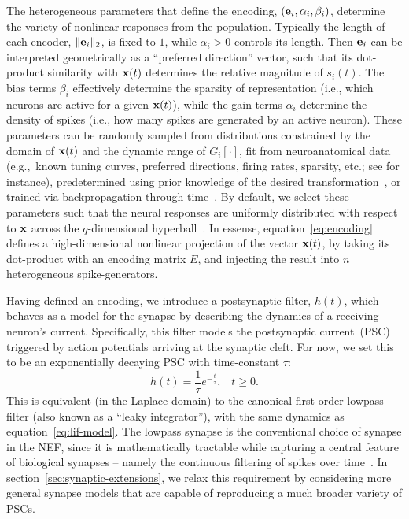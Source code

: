 The heterogeneous parameters that define the encoding, $(\mathbf{e}_i, \alpha_i, \beta_i)$, determine the variety of nonlinear responses from the population.
Typically the length of each encoder, $\| \mathbf{e}_i \|_2$, is fixed to $1$, while $\alpha_i > 0$ controls its length.
Then $\mathbf{e}_i$ can be interpreted geometrically as a ``preferred direction'' vector, such that its dot-product similarity with $\mathbf{x}(t)$ determines the relative magnitude of $s_i(t)$.
The bias terms $\beta_i$ effectively determine the sparsity of representation (i.e., which neurons are active for a given $\mathbf{x}(t)$), while the gain terms $\alpha_i$ determine the density of spikes (i.e., how many spikes are generated by an active neuron).
These parameters can be randomly sampled from distributions constrained by the domain of $\mathbf{x}(t)$ and the dynamic range of $G_i \left[ \cdot \right]$, fit from neuroanatomical data (e.g.,~known tuning curves, preferred directions, firing rates, sparsity, etc.; see \citet{voelker2016a} for instance), predetermined using prior knowledge of the desired transformation~\citep{jgosmann2015}, or trained via backpropagation through time~\citep{rasmussen2018nengodl}.
By default, we select these parameters such that the neural responses are uniformly distributed with respect to $\mathbf{x}$ across the $q$-dimensional hyperball~\citep[][pp.~51--65]{gosmann2018}.
In essense, equation~\ref{eq:encoding} defines a high-dimensional nonlinear projection of the vector $\mathbf{x}(t)$, by taking its dot-product with an encoding matrix $E$, and injecting the result into $n$ heterogeneous spike-generators.

Having defined an encoding, we introduce a postsynaptic filter, $h(t)$, which behaves as a model for the synapse by describing the dynamics of a receiving neuron's current.
Specifically, this filter models the postsynaptic current~(PSC) triggered by action potentials arriving at the synaptic cleft.
For now, we set this to be an exponentially decaying PSC with time-constant $\tau$:
\begin{equation} \label{eq:lowpass-impulse}
h(t) = \frac{1}{\tau} e^{-\frac{t}{\tau}} \text{,} \quad t \ge 0 \text{.}
\end{equation}
This is equivalent (in the Laplace domain) to the canonical first-order lowpass filter (also known as a ``leaky integrator''), with the same dynamics as equation~\ref{eq:lif-model}.
The lowpass synapse is the conventional choice of synapse in the NEF, since it is mathematically tractable while capturing a central feature of biological synapses -- namely the continuous filtering of spikes over time~\citep{eliasmith2003a}.
In section~\ref{sec:synaptic-extensions}, we relax this requirement by considering more general synapse models that are capable of reproducing a much broader variety of PSCs.

